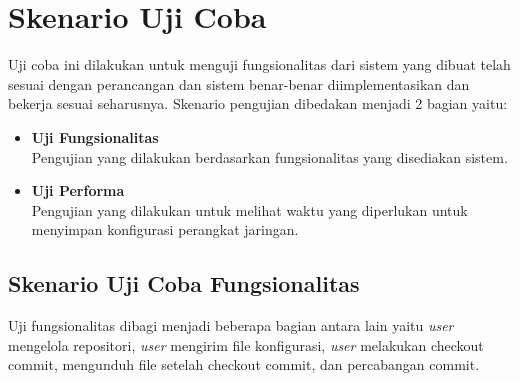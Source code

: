 \section{Skenario Uji Coba}
Uji coba ini dilakukan untuk menguji fungsionalitas dari sistem yang dibuat telah sesuai dengan perancangan dan sistem benar-benar diimplementasikan dan bekerja sesuai seharusnya. Skenario pengujian dibedakan menjadi 2 bagian yaitu:
\begin{itemize}
	\item \textbf{Uji Fungsionalitas} \\
	Pengujian yang dilakukan berdasarkan fungsionalitas yang disediakan sistem.
	\item \textbf{Uji Performa} \\
	Pengujian yang dilakukan untuk melihat waktu yang diperlukan untuk menyimpan konfigurasi perangkat jaringan.
\end{itemize}  
	
    
    
    \subsection{Skenario Uji Coba Fungsionalitas}
    Uji fungsionalitas dibagi menjadi beberapa bagian antara lain yaitu \textit{user} mengelola repositori, \textit{user} mengirim file konfigurasi, \textit{user} melakukan checkout commit, mengunduh file setelah checkout commit, dan percabangan commit.
    	

